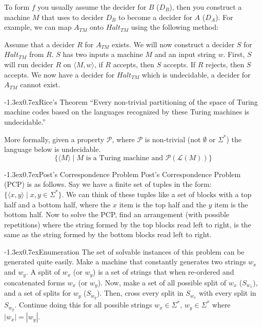\documentclass[10pt,landscape]{article}
\makeatletter
\renewcommand{\section}{\@startsection{section}{1}{0pt}%
                        {-1.3ex}{0.7ex}{\normalfont\large\bfseries}}
\renewcommand{\subsection}{\@startsection{subsection}{2}{0pt}%
                           {-1.3ex}{0.7ex}{\normalfont\normalsize\bfseries}}
\newcommand{\spbar}{\;|\;}
\newcommand{\langof}{\mathcal{L}}
\newcommand{\property}{\mathcal{P}}
\makeatother
\begin{document}
\begin{multicols*}{3}
To form $f$ you usually assume the decider for $B$ ($D_B$), then you construct
a machine $M$ that uses to decider $D_B$ to become a decider for $A$ ($D_A$).
For example, we can map $A_{TM}$ onto $Halt_{TM}$ using the following method:

Assume that a decider $R$ for $A_{TM}$ exists. We will now construct
a decider $S$ for $Halt_{TM}$ from $R$. $S$ has two inputs a machine $M$ and
an input string $w$. First, $S$ will run decider $R$ on $\langle M, w\rangle$,
if $R$ accepts, then $S$ accepts. If $R$ rejects, then $S$ accepts. We
now have a decider for $Halt_{TM}$ which is undecidable, a decider for
$A_{TM}$ cannot exist.

\subsection{Rice's Theorem}
``Every non-trivial partitioning of the space of Turing machine 
codes based on the languages recognized by these Turing machines 
is undecidable.''

More formally, given a property $\property$, where $\property$ is
non-trivial (not $\emptyset$ or $\Sigma^*$) the language below is
undecidable.
\[
    \{\langle M \rangle \spbar M \text{ is a Turing machine and } 
        \property(\langof(M))\}
\]

\section{Post's Correspondence Problem}
Post's Correspondence Problem (PCP) is as follows. Say we have a finite set of
tuples in the form: $\{\langle x, y \rangle \spbar x, y \in \Sigma^*\}$. We can think
of these tuples like a set of blocks with a top half and a bottom half, where
the $x$ item is the top half and the $y$ item is the bottom half. Now to 
solve the PCP, find an arrangement (with possible repetitions) where the
string formed by the top blocks read left to right, is the same as the string
formed by the bottom blocks read left to right.

\subsection{Enumeration}
The set of solvable instances of this problem can be generated quite easily.
Make a machine that constantly generates two strings $w_x$ and $w_y$. A split
of $w_x$ (or $w_y$) is a set of strings that when re-ordered and concatenated forms
$w_x$ (or $w_y$). Now, make a set of all possible split of $w_x$ ($S_{w_x}$), and a set of
splits for $w_y$ ($S_{w_y}$). Then, cross every split in $S_{w_x}$  with every split
in $S_{w_y}$. Continue doing this for all possible strings 
$w_x \in \Sigma^*$, $w_y \in \Sigma^*$ where $|w_x| = |w_y|$.


\end{multicols*}
\end{document}
